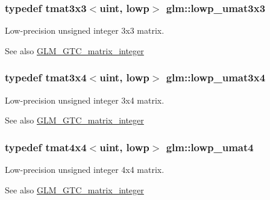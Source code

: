 \subsubsection[{lowp\+\_\+umat3x3}]{\setlength{\rightskip}{0pt plus 5cm}typedef tmat3x3$<${\bf uint}, lowp$>$ {\bf glm\+::lowp\+\_\+umat3x3}}\label{group__gtc__matrix__integer_gab27a50de8b11ec09b2f5cf1cf4c1a062}
Low-\/precision unsigned integer 3x3 matrix. \begin{DoxySeeAlso}{See also}
\hyperlink{group__gtc__matrix__integer}{G\+L\+M\+\_\+\+G\+T\+C\+\_\+matrix\+\_\+integer} 
\end{DoxySeeAlso}
\hypertarget{group__gtc__matrix__integer_ga2ed807c71afb8c0f8742bb03e9f71829}{}
\subsubsection[{lowp\+\_\+umat3x4}]{\setlength{\rightskip}{0pt plus 5cm}typedef tmat3x4$<${\bf uint}, lowp$>$ {\bf glm\+::lowp\+\_\+umat3x4}}\label{group__gtc__matrix__integer_ga2ed807c71afb8c0f8742bb03e9f71829}
Low-\/precision unsigned integer 3x4 matrix. \begin{DoxySeeAlso}{See also}
\hyperlink{group__gtc__matrix__integer}{G\+L\+M\+\_\+\+G\+T\+C\+\_\+matrix\+\_\+integer} 
\end{DoxySeeAlso}
\hypertarget{group__gtc__matrix__integer_gaa430d894a3290d551061d0d77c017cec}{}
\subsubsection[{lowp\+\_\+umat4}]{\setlength{\rightskip}{0pt plus 5cm}typedef tmat4x4$<${\bf uint}, lowp$>$ {\bf glm\+::lowp\+\_\+umat4}}\label{group__gtc__matrix__integer_gaa430d894a3290d551061d0d77c017cec}
Low-\/precision unsigned integer 4x4 matrix. \begin{DoxySeeAlso}{See also}
\hyperlink{group__gtc__matrix__integer}{G\+L\+M\+\_\+\+G\+T\+C\+\_\+matrix\+\_\+integer} 
\end{DoxySeeAlso}
\hypertarget{group__gtc__matrix__integer_ga5f4e6bb892b20b532bd9caa9aee120b9}{}
